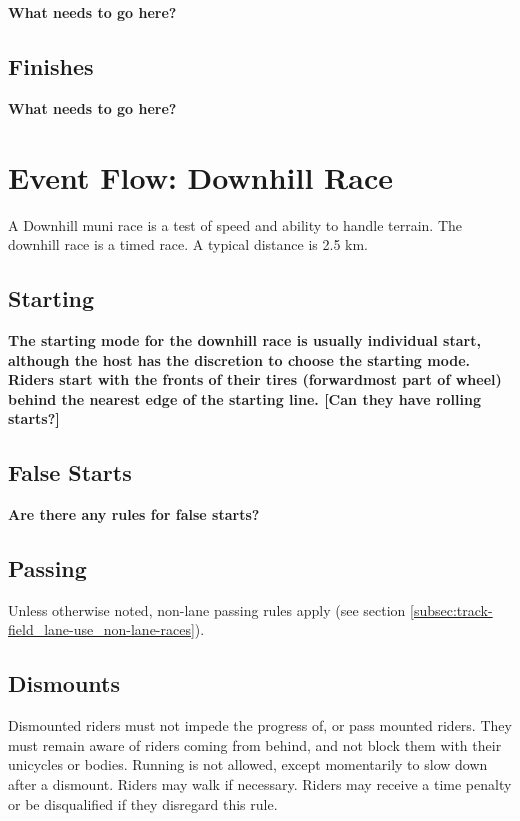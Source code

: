 \textbf{What needs to go here?}

\subsection{Finishes}

\textbf{What needs to go here?}

\section{Event Flow: Downhill Race \label{sec:muni_downhill}}

A Downhill muni race is a test of speed and ability to handle terrain. The downhill race is a timed race. A typical distance is 2.5 km.

\subsection{Starting}

\textbf{The starting mode for the downhill race is usually individual 
start, although the host has the discretion to choose the starting 
mode. Riders start with the fronts of their tires (forwardmost part of wheel)
 behind the nearest edge of the starting line. [Can they have rolling starts?]}

\subsection{False Starts}

\textbf{Are there any rules for false starts?}

\subsection{Passing}

Unless otherwise noted, non-lane passing rules apply (see section \ref{subsec:track-field_lane-use_non-lane-races}).

\subsection{Dismounts}

Dismounted riders must not impede the progress of, or pass mounted riders.
They must remain aware of riders coming from behind, and not block them with their
unicycles or bodies.
Running is not allowed, except momentarily to slow down after a dismount.
Riders may walk if necessary.
Riders may receive a time penalty or be disqualified if they disregard this rule.

